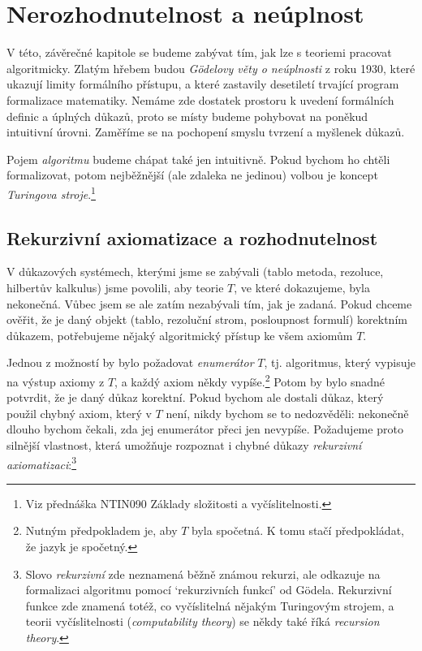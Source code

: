 \chapter{Nerozhodnutelnost a neúplnost}

V této, závěrečné kapitole se budeme zabývat tím, jak lze s teoriemi pracovat algoritmicky. Zlatým hřebem budou \emph{Gödelovy věty o neúplnosti} z roku 1930, které ukazují limity formálního přístupu, a které zastavily desetiletí trvající program formalizace matematiky. Nemáme zde dostatek prostoru k uvedení formálních definic a úplných důkazů, proto se místy budeme pohybovat na poněkud intuitivní úrovni. Zaměříme se na pochopení smyslu tvrzení a myšlenek důkazů.

Pojem \emph{algoritmu} budeme chápat také jen intuitivně. Pokud bychom ho chtěli formalizovat, potom nejběžnější (ale zdaleka ne jedinou) volbou je koncept \emph{Turingova stroje}.\footnote{Viz přednáška NTIN090 Základy složitosti a vyčíslitelnosti.}

\section{Rekurzivní axiomatizace a rozhodnutelnost}

V důkazových systémech, kterými jsme se zabývali (tablo metoda, rezoluce, hilbertův kalkulus) jsme povolili, aby teorie $T$, ve které dokazujeme, byla nekonečná. Vůbec jsem se ale zatím nezabývali tím, jak je zadaná. Pokud chceme ověřit, že je daný objekt (tablo, rezoluční strom, posloupnost formulí) korektním důkazem, potřebujeme nějaký algoritmický přístup ke všem axiomům $T$. 

Jednou z možností by bylo požadovat \emph{enumerátor} $T$, tj. algoritmus, který vypisuje na výstup axiomy z $T$, a každý axiom někdy vypíše.\footnote{Nutným předpokladem je, aby $T$ byla spočetná. K tomu stačí předpokládat, že jazyk je spočetný.} Potom by bylo snadné potvrdit, že je daný důkaz korektní. Pokud bychom ale dostali důkaz, který použil chybný axiom, který v $T$ není, nikdy bychom se to nedozvěděli: nekonečně dlouho bychom čekali, zda jej enumerátor přeci jen nevypíše. Požadujeme proto silnější vlastnost, která umožňuje rozpoznat i chybné důkazy \emph{rekurzivní axiomatizaci}:\footnote{Slovo \emph{rekurzivní} zde neznamená běžně známou rekurzi, ale odkazuje na formalizaci algoritmu pomocí `rekurzivních funkcí' od Gödela. Rekurzivní funkce zde znamená totéž, co vyčíslitelná nějakým Turingovým strojem, a teorii vyčíslitelnosti (\emph{computability theory}) se někdy také říká \emph{recursion theory}.}

